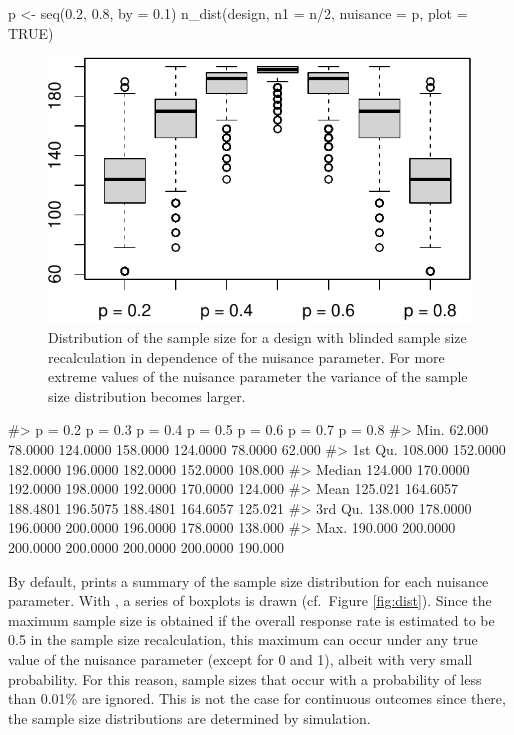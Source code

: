 \begin{example}
p <- seq(0.2, 0.8, by = 0.1)
n_dist(design, n1 = n/2, nuisance = p, plot = TRUE)
\end{example}

\begin{figure}
\includegraphics{blindrecalc_paper_files/figure-latex/sample-size-distribution-1} \caption{\label{fig:dist}Distribution of the sample size for a design with blinded sample size recalculation in dependence of the nuisance parameter. For more extreme values of the nuisance parameter the variance of the sample size distribution becomes larger.}\label{fig:sample-size-distribution}
\end{figure}

\begin{example}
#>         p = 0.2  p = 0.3  p = 0.4  p = 0.5  p = 0.6  p = 0.7 p = 0.8
#> Min.     62.000  78.0000 124.0000 158.0000 124.0000  78.0000  62.000
#> 1st Qu. 108.000 152.0000 182.0000 196.0000 182.0000 152.0000 108.000
#> Median  124.000 170.0000 192.0000 198.0000 192.0000 170.0000 124.000
#> Mean    125.021 164.6057 188.4801 196.5075 188.4801 164.6057 125.021
#> 3rd Qu. 138.000 178.0000 196.0000 200.0000 196.0000 178.0000 138.000
#> Max.    190.000 200.0000 200.0000 200.0000 200.0000 200.0000 190.000
\end{example}

By default,  prints a summary of the sample size
distribution for each nuisance parameter. With , a
series of boxplots is drawn (cf.~Figure \ref{fig:dist}). Since the
maximum sample size is obtained if the overall response rate is
estimated to be 0.5 in the sample size recalculation, this maximum can
occur under any true value of the nuisance parameter (except for 0 and
1), albeit with very small probability. For this reason, sample sizes
that occur with a probability of less than 0.01\% are ignored. This is
not the case for continuous outcomes since there, the sample size
distributions are determined by simulation.

